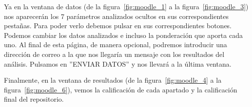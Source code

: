 \documentclass[a4paper, 12pt]{book}
\begin{document}
Ya en la ventana de datos (de la figura~\ref{fig:moodle_1} a la figura~\ref{fig:moodle_3}) nos aparecerán los 7 parámetros analizados ocultos en sus correspondientes pestañas. Para poder verlo debemos pulsar en sus correspondientes botones. Podemos cambiar los datos analizados e incluso la ponderación que aporta cada uno. Al final de esta página, de manera opcional, podremos introducir una dirección de correo a la que nos llegaría un mensaje con los resultados del análisis. Pulsamos en ''ENVIAR DATOS'' y nos llevará a la última ventana.

Finalmente, en la ventana de resultados (de la figura~\ref{fig:moodle_4} a la figura~\ref{fig:moodle_6}), vemos la calificación de cada apartado y la calificación final del repositorio.


\cleardoublepage


\end{document}
